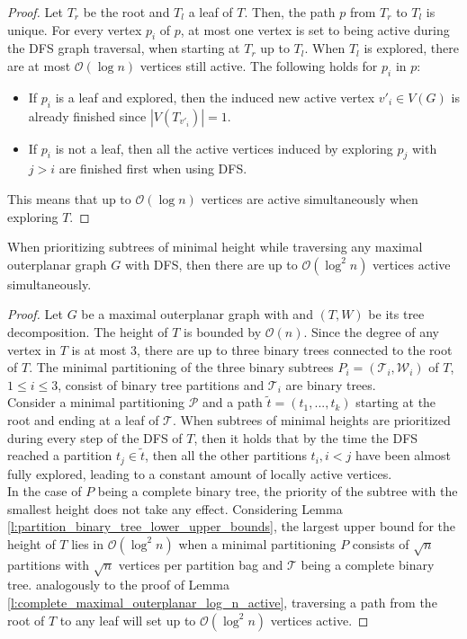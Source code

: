 \begin{proof}
	Let $T_r$ be the root and $T_l$ a leaf of $T$. Then, the path $p$ from $T_r$ to $T_l$ is unique. For every vertex $p_i$ of $p$, at most one vertex is set to being active during the DFS graph traversal, when starting at $T_r$ up to $T_l$. When $T_l$ is explored, there are at most $\mathcal{O}(\log n)$ vertices still active. 
	The following holds for $p_i$ in $p$:
	\begin{itemize}
		\item If $p_i$ is a leaf and explored, then the induced new active vertex $v'_i\in V(G)$ is already finished since $|V(T_{v'_i})| = 1$.
		\item If $p_i$ is not a leaf, then all the active vertices induced by exploring $p_{j}$ with $j>i$ are finished first when using DFS.
	\end{itemize}
	This means that up to $\mathcal{O}(\log n)$ vertices are active simultaneously when exploring $T$.
\end{proof}

\begin{lemma}
	When prioritizing subtrees of minimal height while traversing any maximal outerplanar graph $G$ with DFS, then there are up to $\mathcal{O}(\log^2 n)$ vertices active simultaneously.\label{l:maximal_outerplanar_log2_n_vercies_active}
\end{lemma}

\begin{proof}
	Let $G$ be a maximal outerplanar graph with and $(T,W)$ be its tree decomposition. The height of $T$ is bounded by $\mathcal{O}(n)$. Since the degree of any vertex in $T$ is at most 3, there are up to three binary trees connected to the root of $T$. The minimal partitioning of the three binary subtrees $P_i = (\mathcal{T}_i,\mathcal{W}_i)$ of $T$, $1\leq i \leq 3$, consist of binary tree partitions and $\mathcal{T}_i$ are binary trees.\\
	Consider a minimal partitioning $\mathcal{P}$ and a path $\tilde{t} = (t_1,...,t_k)$ starting at the root and ending at a leaf of $\mathcal{T}$. When subtrees of minimal heights are prioritized during every step of the DFS of $T$, then it holds that by the time the DFS reached a partition $t_j \in \tilde{t}$, then all the other partitions $t_i, i<j$ have been almost fully explored, leading to a constant amount of locally active vertices.\\
	In the case of $P$ being a complete binary tree, the priority of the subtree with the smallest height does not take any effect. Considering Lemma \ref{l:partition_binary_tree_lower_upper_bounds}, the largest upper bound for the height of $T$ lies in $\mathcal{O}(\log^2 n)$ when a minimal partitioning $P$ consists of $\sqrt{n}$ partitions with $\sqrt{n}$ vertices per partition bag and $\mathcal{T}$ being a complete binary tree. analogously to the proof of Lemma \ref{l:complete_maximal_outerplanar_log_n_active}, traversing a path from the root of $T$ to any leaf will set up to $\mathcal{O}(\log^2 n)$ vertices active.
\end{proof}

